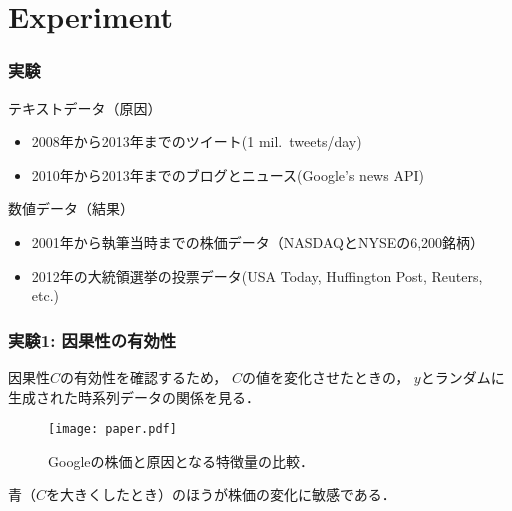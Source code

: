 \documentclass[12pt,noamssymb,usepdftitle=false]{beamer}
\begin{document}
\section{Experiment}
\begin{frame}
    \frametitle{実験}

    テキストデータ（原因）
    \begin{itemize}
        \item 2008年から2013年までのツイート(1 mil.\ tweets/day)
        \item 2010年から2013年までのブログとニュース(Google's news API)
    \end{itemize}

    \bigskip

    数値データ（結果）
    \begin{itemize}
        \item 2001年から執筆当時までの株価データ（NASDAQとNYSEの6,200銘柄）
        \item 2012年の大統領選挙の投票データ(USA Today, Huffington Post, Reuters, etc.)
    \end{itemize}
\end{frame}

\begin{frame}
    \frametitle{実験1: 因果性の有効性}
    因果性$C$の有効性を確認するため，
    $C$の値を変化させたときの，
    $y$とランダムに生成された時系列データの関係を見る．
    \begin{figure}
        \texttt{[image: paper.pdf]}
        \caption{Googleの株価と原因となる特徴量の比較．}
    \end{figure}
    青（$C$を大きくしたとき）のほうが株価の変化に敏感である．
\end{frame}
\end{document}
